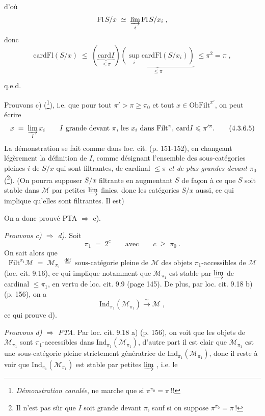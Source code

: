 \documentclass[11pt]{article}
\newcommand{\printedpage}[1]{\marginpar{\footnotesize p.~#1}}
\newcommand{\msp}[1]{\marginpar{\footnotesize [#1]}}
\newcommand{\Ind}{\mathrm{Ind}}
\newcommand{\card}{\mathrm{card}}
\newcommand{\Fl}{\mathrm{Fl}}
\newcommand{\Ob}{\mathrm{Ob}}
\newcommand{\Filt}{\mathrm{Filt}}
\begin{document}
\setcounter{footnote}{11}

\printedpage{14}

d'où
\[
\Fl\,S/x \;\simeq\; \varinjlim_{i} \Fl\,S/x_i \;,
\]
donc
\[
\card\Fl(S/x) \;\leqslant\; (\underbrace{\card I}_{\leqslant\pi})\underbrace{(\sup_{i}\card\Fl(S/x_i))}_{\leqslant\pi} \;\leqslant \pi^2 = \pi \;,
\]

\hfill q.e.d.

\msp{page 76}
Prouvons c) (\footnote{\textit{Démonstration canulée}, ne marche que si $\pi^{\pi_0} = \pi$\,!!}), i.e. que pour tout $\pi' > \pi \geqslant \pi_0$ et tout $x \in \Ob\Filt^{\pi'}$, on peut écrire
\[
x \;=\; \varinjlim_{I} x_i \qquad I \text{ grande devant } \pi\text{, les } x_i \text{ dans } \Filt^{\pi}\text{, } \card I \leqslant \pi'^{\pi}. \tag*{(4.3.6.5)}
\]
La démonstration se fait comme dans loc. cit. (p. 151-152), en changeant légèrement la définition de $I$, comme désignant l'ensemble des sous-catégories pleines $i$ de $S/x$ qui sont filtrantes, de cardinal $\leqslant \pi$ \textit{et de plus grandes devant} $\pi_0$ (\footnote{Il n'est pas sûr que $I$ soit grande devant $\pi$, sauf si on suppose $\pi^{\pi_0} = \pi$\,!}). (On pourra supposer $S/x$ filtrante en augmentant $S$ de façon à ce que $S$ soit stable dans $\mathcal{M}$ par petites $\varinjlim$ finies, donc les catégories $S/x$ aussi, ce qui implique qu'elles sont filtrantes. Il est)

On a donc prouvé PTA $\Longrightarrow$ c).

\textit{Prouvons c) $\Longrightarrow$ d).} Soit
\[
\pi_1 \;=\; 2^c \qquad \text{avec} \qquad c \;\geqslant\; \pi_0 \;.
\]
On sait alors que
\[
\Filt^{\pi_1}\mathcal{M} \;=\; \mathcal{M}_{\pi_1} \;\overset{\text{déf}}{=}\; \text{sous-catégorie pleine de $\mathcal{M}$ des objets $\pi_1$-accessibles de $\mathcal{M}$}
\]
(loc. cit. 9.16), ce qui implique notamment que $\mathcal{M}_{\pi_1}$ est stable par $\varinjlim$ de cardinal $\leqslant \pi_1$, en vertu de loc. cit. 9.9 (page 145). De plus,
\msp{page 77}
par loc. cit. 9.18 b) (p. 156), on a
\[
\Ind_{\pi_1}(\mathcal{M}_{\pi_1}) \xrightarrow{\;\sim\;} \mathcal{M} \;,
\]
ce qui prouve d).

\textit{Prouvons d) $\Longrightarrow$ PTA.} Par loc. cit. 9.18 a) (p. 156), on voit que les objets de $\mathcal{M}_{\pi_1}$ sont $\pi_1$-accessibles dans $\Ind_{\pi_1}(\mathcal{M}_{\pi_1})$, d'autre part il est clair que $\mathcal{M}_{\pi_1}$ est une sous-catégorie pleine strictement génératrice de $\Ind_{\pi_1}(\mathcal{M}_{\pi_1})$, donc il reste à voir que $\Ind_{\pi_1}(\mathcal{M}_{\pi_1})$ est stable par petites $\varinjlim$ , i.e. le
\end{document}
